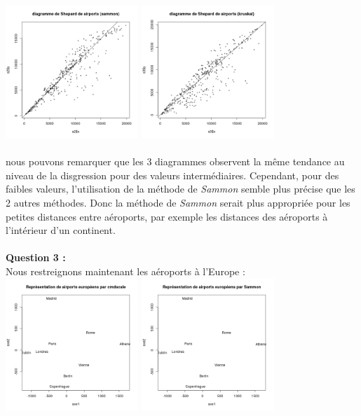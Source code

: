 \documentclass[a4paper, 10pt]{article}
\begin{document}
\includegraphics[height = 5cm, width = 5cm]{plots/plot_airports_shepard_sammon.png}
\includegraphics[height = 5cm, width = 5cm]{plots/plot_airports_shepard_kruskal.png}\\ \\
nous pouvons remarquer que les 3 diagrammes observent la même tendance au niveau de la disgression pour des valeurs intermédiaires.
Cependant, pour des faibles valeurs, l'utilisation de la méthode de \textit{Sammon} semble plus précise que les 2 autres méthodes.
Donc la méthode de \textit{Sammon} serait plus appropriée pour les petites distances entre aéroports, par exemple les distances
des aéroports à l'intérieur d'un continent.\\ \\
\textbf{Question 3 :}\\
Nous restreignons maintenant les aéroports à l'Europe :\\
\includegraphics[height = 5cm, width = 5cm]{plots/plot_euro_cmdscale.png}
\includegraphics[height = 5cm, width = 5cm]{plots/plot_euro_sammon.png}
\end{document}
